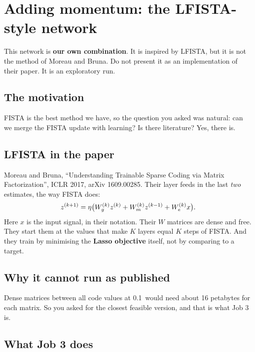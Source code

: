 \chapter{Adding momentum: the LFISTA-style network}\label{ch:lfista}

\begin{careful}
This network is \textbf{our own combination}. It is inspired by LFISTA, but it is not the method of Moreau and
Bruna. Do not present it as an implementation of their paper. It is an exploratory run.
\end{careful}

\section{The motivation}

FISTA is the best method we have, so the question you asked was natural: can we merge the FISTA update with
learning? Is there literature? Yes, there is.

\section{LFISTA in the paper}

Moreau and Bruna, ``Understanding Trainable Sparse Coding via Matrix Factorization'', ICLR 2017, arXiv 1609.00285.
Their layer feeds in the last \emph{two} estimates, the way FISTA does:
\begin{equation}
z^{(k+1)} = \eta\big(W_g^{(k)} z^{(k)} + W_m^{(k)} z^{(k-1)} + W_e^{(k)} x\big).
\end{equation}
Here $x$ is the input signal, in their notation. Their $W$ matrices are dense and free. They start them at
the values that make $K$ layers equal $K$ steps of FISTA. And they train by minimising the \textbf{Lasso objective}
itself, not by comparing to a target.

\section{Why it cannot run as published}

Dense matrices between all code values at 0.1\um\ would need about 16 petabytes for each matrix. So you asked for
the closest feasible version, and that is what Job 3 is.

\section{What Job 3 does}

